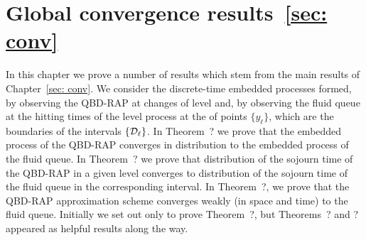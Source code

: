 \chapter{Global convergence results~\ref{sec: conv}}\label{ch: global results}
In this chapter we prove a number of results which stem from the main results of Chapter~\ref{sec: conv}. We consider the discrete-time embedded processes formed, by observing the QBD-RAP at changes of level and, by observing the fluid queue at the hitting times of the level process at the of points \(\{y_\ell\}\), which are the boundaries of the intervals \(\{\mathcal{D}_\ell\}\). In Theorem~? we prove that the embedded process of the QBD-RAP converges in distribution to the embedded process of the fluid queue. In Theorem~? we prove that distribution of the sojourn time of the QBD-RAP in a given level converges to distribution of the sojourn time of the fluid queue in the corresponding interval. In Theorem~?, we prove that the QBD-RAP approximation scheme converges weakly (in space and time) to the fluid queue. Initially we set out only to prove Theorem~?, but Theorems~? and ? appeared as helpful results along the way. 


